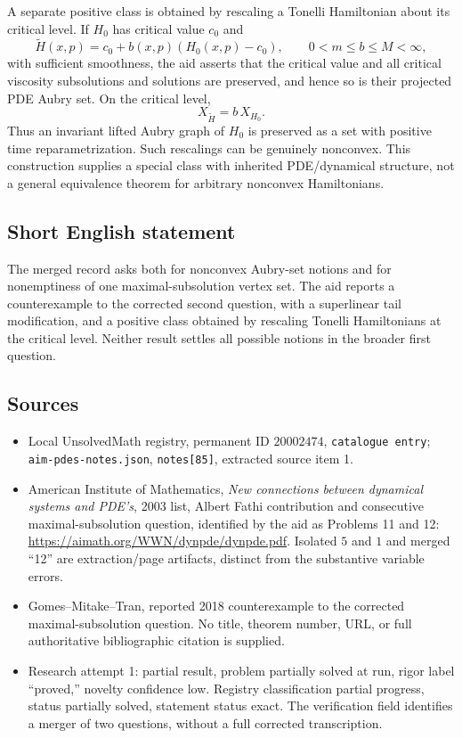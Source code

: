 \documentclass[11pt]{article}
\begin{document}
A separate positive class is obtained by rescaling a Tonelli Hamiltonian about its critical level. If $H_0$ has critical value $c_0$ and
\[
\widetilde H(x,p)=c_0+b(x,p)(H_0(x,p)-c_0),\qquad0<m\leq b\leq M<\infty,
\]
with sufficient smoothness, the aid asserts that the critical value and all critical viscosity subsolutions and solutions are preserved, and hence so is their projected PDE Aubry set. On the critical level,
\[
X_{\widetilde H}=b\,X_{H_0}.
\]
Thus an invariant lifted Aubry graph of $H_0$ is preserved as a set with positive time reparametrization. Such rescalings can be genuinely nonconvex. This construction supplies a special class with inherited PDE/dynamical structure, not a general equivalence theorem for arbitrary nonconvex Hamiltonians.
\subsection{Short English statement}
The merged record asks both for nonconvex Aubry-set notions and for nonemptiness of one maximal-subsolution vertex set. The aid reports a counterexample to the corrected second question, with a superlinear tail modification, and a positive class obtained by rescaling Tonelli Hamiltonians at the critical level. Neither result settles all possible notions in the broader first question.
\subsection{Sources}
\begin{itemize}
\item Local UnsolvedMath registry, permanent ID $20002474$, \texttt{catalogue entry}; \texttt{aim-pdes-notes.json}, \texttt{notes[85]}, extracted source item 1.
\item American Institute of Mathematics, \emph{New connections between dynamical systems and PDE's}, 2003 list, Albert Fathi contribution and consecutive maximal-subsolution question, identified by the aid as Problems 11 and 12: \url{https://aimath.org/WWN/dynpde/dynpde.pdf}. Isolated $5$ and $1$ and merged ``12'' are extraction/page artifacts, distinct from the substantive variable errors.
\item Gomes--Mitake--Tran, reported 2018 counterexample to the corrected maximal-subsolution question. No title, theorem number, URL, or full authoritative bibliographic citation is supplied.
\item Research attempt 1: partial result, problem partially solved at run, rigor label ``proved,'' novelty confidence low. Registry classification partial progress, status partially solved, statement status exact. The verification field identifies a merger of two questions, without a full corrected transcription.
\end{itemize}
\end{document}
